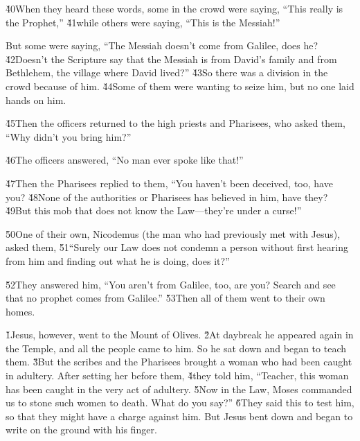 \v{40}When they heard these words, some in the crowd were saying, ``This really is the Prophet,'' \v{41}while others were saying, ``This is the Messiah!''

But some were saying, ``The Messiah doesn't come from Galilee, does he? \v{42}Doesn't the Scripture say that the Messiah is from David's family and from Bethlehem, the village where David lived?'' \v{43}So there was a division in the crowd because of him. \v{44}Some of them were wanting to seize him, but no one laid hands on him.

\v{45}Then the officers returned to the high priests and Pharisees, who asked them, ``Why didn't you bring him?''

\v{46}The officers answered, ``No man ever spoke like that!''

\v{47}Then the Pharisees replied to them, ``You haven't been deceived, too, have you? \v{48}None of the authorities or Pharisees has believed in him, have they? \v{49}But this mob that does not know the Law---they're under a curse!''

\v{50}One of their own, Nicodemus (the man who had previously met with Jesus), asked them, \v{51}``Surely our Law does not condemn a person without first hearing from him and finding out what he is doing, does it?''

\v{52}They answered him, ``You aren't from Galilee, too, are you? Search and see that no prophet comes from Galilee.'' \v{53}Then all of them went to their own homes.

\v{1}Jesus, however, went to the Mount of Olives. \v{2}At daybreak he appeared again in the Temple, and all the people came to him. So he sat down and began to teach them. \v{3}But the scribes and the Pharisees brought a woman who had been caught in adultery. After setting her before them, \v{4}they told him, ``Teacher, this woman has been caught in the very act of adultery. \v{5}Now in the Law, Moses commanded us to stone such women to death. What do you say?'' \v{6}They said this to test him, so that they might have a charge against him. But Jesus bent down and began to write on the ground with his finger.

